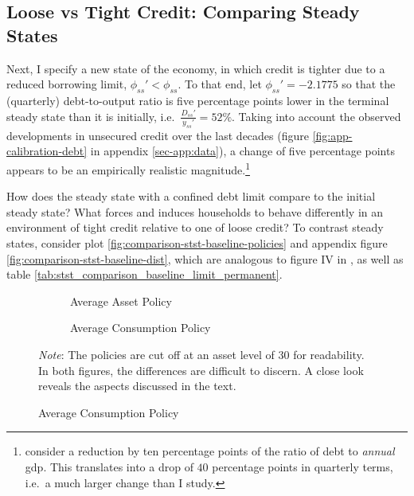 \documentclass[a4paper,12pt]{article} %
\numberwithin{equation}{section} %
\numberwithin{figure}{section}
\numberwithin{table}{section}
\begin{document}
\subsection{Loose vs Tight Credit: Comparing Steady States}
\label{sec:limit-stst-tight}

Next, I specify a new state of the economy, in which credit is tighter due to a reduced borrowing limit, $\phi_{ss}' < \phi_{ss}$. To that end, let $\phi_{ss}' = -2.1775$ so that the (quarterly) debt-to-output ratio is five percentage points lower in the terminal steady state than it is initially, i.e.~$\frac{D_{ss}'}{y_{ss}'} = 52\%$. Taking into account the observed developments in unsecured credit over the last decades (figure \ref{fig:app-calibration-debt} in appendix \ref{sec-app:data}), a change of five percentage points appears to be an empirically realistic magnitude.\footnote{\textcite{gl2017} consider a reduction by ten percentage points of the ratio of debt to \textit{annual} \Gls{gdp}. This translates into a drop of $40$ percentage points in quarterly terms, i.e.~a much larger change than I study.} 

How does the steady state with a confined debt limit compare to the initial steady state? What forces and induces households to behave differently in an environment of tight credit relative to one of loose credit? To contrast steady states, consider plot \ref{fig:comparison-stst-baseline-policies} and appendix figure \ref{fig:comparison-stst-baseline-dist}, which are analogous to figure IV in \textcite[p.1443]{gl2017}, as well as table \ref{tab:stst_comparison_baseline_limit_permanent}. 

\begin{figure}[t]
    \caption{Baseline Model -- Shock to Borrowing Limit: Household Policies}
    \label{fig:comparison-stst-baseline-policies}
    \centering
    \begin{subfigure}[b]{0.49\textwidth}
    \caption{Average Asset Policy}
    \label{fig:comparison-stst-baseline-policies-a}
         \centering
         
     \end{subfigure}
     \hfill
     \begin{subfigure}[b]{0.49\textwidth}
     \caption{Average Consumption Policy}
     \label{fig:comparison-stst-baseline-policies-c}
         \centering
         
     \end{subfigure}

    \vspace{10pt}
     
     \justifying
     \footnotesize
	\textit{Note}: The policies are cut off at an asset level of $30$ for readability. In both figures, the differences are difficult to discern. A close look reveals the aspects discussed in the text.
\end{figure}
\end{document}

